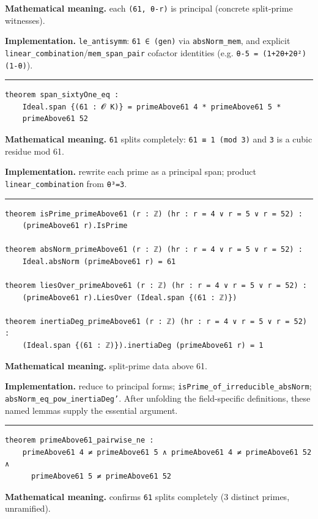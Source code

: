 \documentclass[UTF8,a4paper,11pt,fontset=fandol]{ctexart}
\theoremstyle{definition}
\newcommand{\statementsep}{\par\medskip\hrule\medskip}
\begin{document}
\noindent\textbf{Mathematical meaning.} each \texttt{(61, θ-r)} is principal (concrete split-prime witnesses).\par
\noindent\textbf{Implementation.} \texttt{le\_\allowbreak{}antisymm}: \texttt{61 ∈ (gen)} via \texttt{absNorm\_\allowbreak{}mem}, and explicit \texttt{linear\_\allowbreak{}combination}/\texttt{mem\_\allowbreak{}span\_\allowbreak{}pair} cofactor identities (e.g. \texttt{θ-5 = (1+2θ+2θ²)(1-θ)}).\par
\statementsep
\begin{verbatim}
theorem span_sixtyOne_eq :
    Ideal.span {(61 : 𝓞 K)} = primeAbove61 4 * primeAbove61 5 *
    primeAbove61 52
\end{verbatim}
\noindent\textbf{Mathematical meaning.} \texttt{61} splits completely: \texttt{61 ≡ 1 (mod 3)} and \texttt{3} is a cubic residue mod 61.\par
\noindent\textbf{Implementation.} rewrite each prime as a principal span; product \texttt{linear\_\allowbreak{}combination} from \texttt{θ³=3}.\par
\statementsep
\begin{verbatim}
theorem isPrime_primeAbove61 (r : ℤ) (hr : r = 4 ∨ r = 5 ∨ r = 52) :
    (primeAbove61 r).IsPrime

theorem absNorm_primeAbove61 (r : ℤ) (hr : r = 4 ∨ r = 5 ∨ r = 52) :
    Ideal.absNorm (primeAbove61 r) = 61

theorem liesOver_primeAbove61 (r : ℤ) (hr : r = 4 ∨ r = 5 ∨ r = 52) :
    (primeAbove61 r).LiesOver (Ideal.span {(61 : ℤ)})

theorem inertiaDeg_primeAbove61 (r : ℤ) (hr : r = 4 ∨ r = 5 ∨ r = 52) :
    (Ideal.span {(61 : ℤ)}).inertiaDeg (primeAbove61 r) = 1
\end{verbatim}
\noindent\textbf{Mathematical meaning.} split-prime data above 61.\par
\noindent\textbf{Implementation.} reduce to principal forms; \texttt{isPrime\_\allowbreak{}of\_\allowbreak{}irreducible\_\allowbreak{}absNorm}; \texttt{absNorm\_\allowbreak{}eq\_\allowbreak{}pow\_\allowbreak{}inertiaDeg'}. After unfolding the field-specific definitions, these named lemmas supply the essential argument.\par
\statementsep
\begin{verbatim}
theorem primeAbove61_pairwise_ne :
    primeAbove61 4 ≠ primeAbove61 5 ∧ primeAbove61 4 ≠ primeAbove61 52 ∧
      primeAbove61 5 ≠ primeAbove61 52
\end{verbatim}
\noindent\textbf{Mathematical meaning.} confirms \texttt{61} splits completely (3 distinct primes, unramified).\par
\end{document}

